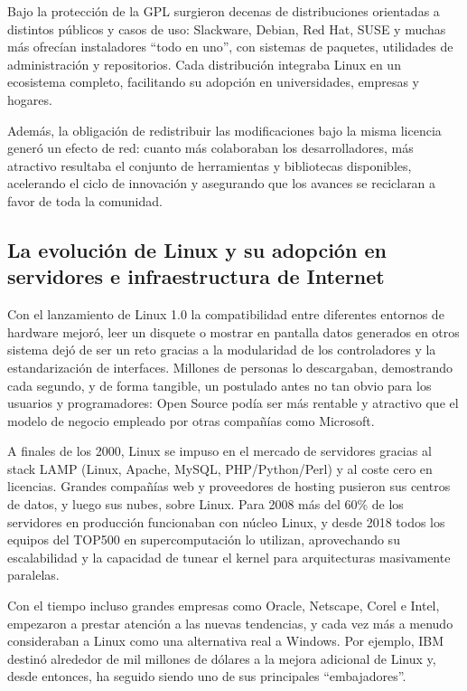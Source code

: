 \documentclass[a4paper,12pt]{article}
\begin{document}
Bajo la protección de la GPL surgieron decenas de distribuciones orientadas 
a distintos públicos y casos de uso: Slackware, Debian, Red Hat, SUSE y 
muchas más ofrecían instaladores “todo en uno”, con sistemas de paquetes, 
utilidades de administración y repositorios. Cada distribución integraba 
Linux en un ecosistema completo, facilitando su adopción en universidades, empresas y hogares.

Además, la obligación de redistribuir las modificaciones bajo la misma licencia 
generó un efecto de red: cuanto más colaboraban los desarrolladores, más atractivo 
resultaba el conjunto de herramientas y bibliotecas disponibles, acelerando el 
ciclo de innovación y asegurando que los avances se reciclaran a favor de toda la comunidad.


\subsection{La evolución de Linux y su adopción en servidores e infraestructura de Internet}

Con el lanzamiento de Linux 1.0 la compatibilidad entre diferentes entornos de hardware mejoró, 
leer un disquete o mostrar en pantalla datos generados en otros sistema dejó de ser un reto 
gracias a la modularidad de los controladores y la estandarización de interfaces. Millones de personas 
lo descargaban, demostrando cada segundo, y de forma tangible, un postulado antes no tan obvio para los 
usuarios y programadores: Open Source podía ser más rentable y atractivo que el modelo de negocio 
empleado por otras compañías como Microsoft.

A finales de los 2000, Linux se impuso en el mercado de servidores gracias al stack LAMP (Linux, Apache, MySQL, PHP/Python/Perl) 
y al coste cero en licencias. Grandes compañías web y proveedores de hosting pusieron sus centros de datos, y luego sus nubes, 
sobre Linux. Para 2008 más del 60\% de los servidores en producción funcionaban con núcleo Linux, y desde 
2018 todos los equipos del TOP500 en supercomputación lo utilizan, aprovechando su escalabilidad y la 
capacidad de tunear el kernel para arquitecturas masivamente paralelas.

Con el tiempo incluso grandes empresas como Oracle, Netscape, Corel e Intel, empezaron a prestar 
atención a las nuevas tendencias, y cada vez más a menudo consideraban a Linux como una alternativa 
real a Windows. Por ejemplo, IBM destinó alrededor de mil millones de dólares a la mejora adicional 
de Linux y, desde entonces, ha seguido siendo uno de sus principales “embajadores”.
\end{document}
